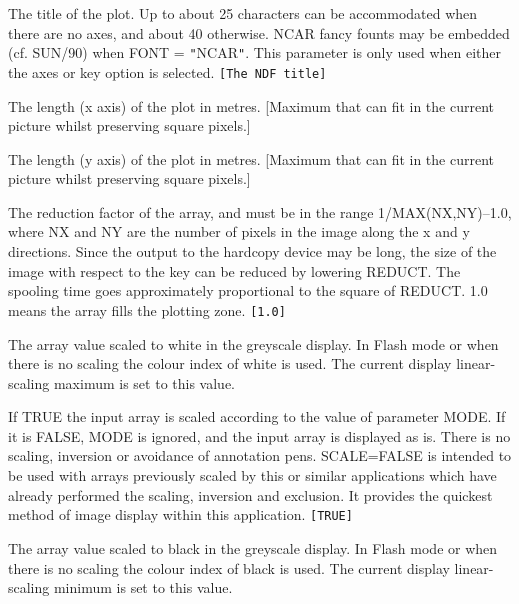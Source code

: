 \documentclass[twoside,11pt]{article}
\newcommand{\sstsubsection}[1]{ \item[{#1}] \mbox{} \\}
\renewcommand{\sstsubsection}[1]{\item[{#1}]}
\begin{document}
{{{      }{
         The title of the plot.  Up to about 25 characters can be
         accommodated when there are no axes, and about 40 otherwise.
         NCAR fancy founts may be embedded (cf. SUN/90) when FONT =
         {\tt "}NCAR{\tt "}.  This parameter is only used when either the axes or
         key option is selected. {\tt [The NDF title]}
      }
      \sstsubsection{
         PXSIZE = \_REAL (Read)
      }{
         The length (x axis) of the plot in metres.  [Maximum that can
         fit in the current picture whilst preserving square pixels.]
      }
      \sstsubsection{
         PYSIZE = \_REAL (Read)
      }{
         The length (y axis) of the plot in metres.  [Maximum that can
         fit in the current picture whilst preserving square pixels.]
      }
      \sstsubsection{
         REDUCT = \_REAL (Read)
      }{
         The reduction factor of the array, and must be in the range
         1/MAX(NX,NY)--1.0, where NX and NY are the number of pixels
         in the image along the x and y directions.  Since the output
         to the hardcopy device may be long, the size of the image
         with respect to the key can be reduced by lowering REDUCT.
         The spooling time goes approximately proportional to the
         square of REDUCT.  1.0 means the array fills the plotting zone.
         {\tt [1.0]}
      }
      \sstsubsection{
         SCAHIGH = \_DOUBLE (Write)
      }{
         The array value scaled to white in the greyscale display.
         In Flash mode or when there is no scaling the colour index of
         white is used.  The current display linear-scaling maximum is
         set to this value.
      }
      \sstsubsection{
         SCALE = \_LOGICAL (Read)
      }{
         If TRUE the input array is scaled according to the value of
         parameter MODE.  If it is FALSE, MODE is ignored, and the input
         array is displayed as is.  There is no scaling, inversion
         or avoidance of annotation pens.  SCALE=FALSE is intended to
         be used with arrays previously scaled by this or similar
         applications which have already performed the scaling,
         inversion and exclusion.  It provides the quickest method of
         image display within this application. {\tt [TRUE]}
      }
      \sstsubsection{
         SCALOW = \_DOUBLE (Write)
      }{
         The array value scaled to black in the greyscale display.
         In Flash mode or when there is no scaling the colour index of
         black is used.  The current display linear-scaling minimum is
         set to this value.
      }
      \sstsubsection{
}}}
\end{document}
